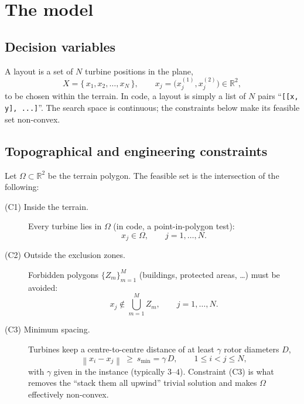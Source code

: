 \documentclass[11pt,a4paper]{article}
\newcommand{\R}{\mathbb{R}}
\newcommand{\norm}[1]{\left\lVert #1 \right\rVert}
\begin{document}
\section{The model}

\subsection{Decision variables}

A layout is a set of $N$ turbine positions in the plane,
\begin{equation}
  X = \{\, x_{1}, x_{2}, \dots, x_{N} \,\},
  \qquad x_{j} = \bigl(x_{j}^{(1)}, x_{j}^{(2)}\bigr) \in \R^{2},
\end{equation}
to be chosen within the terrain. In code, a layout is simply a list of $N$
pairs ``\texttt{[[x, y], ...]}''. The search space is continuous; the
constraints below make its feasible set non-convex.

\subsection{Topographical and engineering constraints}

Let $\Omega \subset \R^{2}$ be the terrain polygon. The feasible set is the
intersection of the following:

\begin{description}
  \item[(C1) Inside the terrain.] Every turbine lies in $\Omega$ (in code, a
  point-in-polygon test):
  \begin{equation}
    x_{j} \in \Omega, \qquad j = 1,\dots,N.
  \end{equation}

  \item[(C2) Outside the exclusion zones.] Forbidden polygons
  $\{Z_{m}\}_{m=1}^{M}$ (buildings, protected areas, \dots) must be avoided:
  \begin{equation}
    x_{j} \notin \bigcup_{m=1}^{M} Z_{m}, \qquad j = 1,\dots,N.
  \end{equation}

  \item[(C3) Minimum spacing.] Turbines keep a centre-to-centre distance of at
  least $\gamma$ rotor diameters $D$,
  \begin{equation}
    \norm{x_{i}-x_{j}} \ \ge \ s_{\min} = \gamma\,D,
    \qquad 1 \le i < j \le N,
  \end{equation}
  with $\gamma$ given in the instance (typically $3$--$4$).
  Constraint (C3) is what removes the ``stack them all upwind'' trivial
  solution and makes $\Omega$ effectively non-convex.
\end{description}
\end{document}
